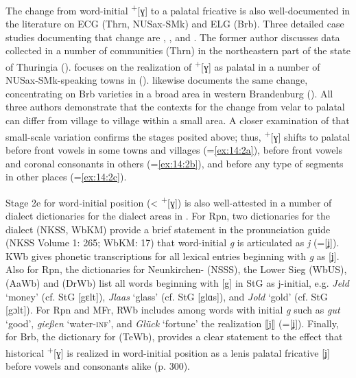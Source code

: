 The change from word-initial  \textsuperscript{+}[ɣ] to a palatal fricative is also well-documented in the literature on ECG (Thrn, NUSax-SMk) and ELG (Brb). Three detailed case studies documenting that change are \citet{Hankel1913}, \citet{Kieser1963}, and \citet{Bathe1965}. The former author discusses data collected in a number of communities (Thrn) in the northeastern part of the state of Thuringia (). \citet{Kieser1963} focuses on the realization of  \textsuperscript{+}[ɣ] as palatal in a number of NUSax-SMk-speaking towns in  (). \citet{Bathe1965} likewise documents the same change, concentrating on Brb varieties in a broad area in western Brandenburg ().  All three authors demonstrate that the contexts for the change from velar to palatal can differ from village to village within a small area. A closer examination of that small-scale variation confirms the stages posited above; thus,  \textsuperscript{+}[ɣ] shifts to palatal before front vowels in some towns and villages (=\ref{ex:14:2a}), before front vowels and coronal consonants in others (=\ref{ex:14:2b}), and before any type of segments in other places (=\ref{ex:14:2c}).\largerpage

Stage 2e for word-initial position (<  \textsuperscript{+}[ɣ]) is also well-attested in a number of dialect dictionaries for the dialect areas in . For Rpn, two dictionaries for the  dialect (NKSS, WbKM) provide a brief statement in the pronunciation guide (NKSS Volume 1: 265; WbKM: 17) that word-initial \textit{g} is articulated as \textit{j} (=[ʝ]). KWb gives phonetic transcriptions for all lexical entries beginning with \textit{g} as [ʝ]. Also for Rpn, the dictionaries for Neunkirchen-  (NSSS), the Lower Sieg (WbUS),  (AaWb) and  (DrWb) list all words beginning with [g] in StG as j-initial, e.g. \textit{Jeld} ‘money’ (cf. StG [gɛlt]), \textit{Jlaas} ‘glass’ (cf. StG [glɑs]), and \textit{Jold} ‘gold’ (cf. StG [gɔlt]). For Rpn and MFr, RWb includes among words with initial \textit{g} such as \textit{gut} ‘good’, \textit{gießen} ‘water-\textsc{inf}’, and \textit{Glück} ‘fortune’ the  realization ⟦j⟧ (=[ʝ]). Finally, for Brb, the dictionary for  (TeWb), provides a clear statement to the effect that historical \textsuperscript{+}[ɣ] is realized in word-initial position as a lenis palatal fricative [ʝ] before vowels and consonants alike (p. 300).

